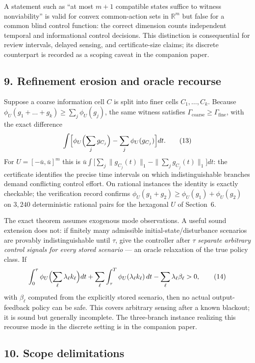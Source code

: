 \documentclass[10pt,twocolumn]{article}
\theoremstyle{definition}
\begin{document}
A statement such as ``at most \(m+1\) compatible states suffice to witness
nonviability'' is valid for convex common-action sets in \(\mathbb{R}^m\) but
false for a common blind control function: the correct dimension counts
independent temporal and informational control decisions. This distinction is
consequential for review intervals, delayed sensing, and certificate-size
claims; its discrete counterpart is recorded as a scoping caveat in the
companion paper.

\subsection{9. Refinement erosion and oracle recourse}\label{erosion}

Suppose a coarse information cell \(C\) is split into finer cells
\(C_1,\dots,C_k\). Because
\(\phi_U(g_1 + \dots + g_k) \ge \sum_j \phi_U(g_j)\), the same witness
satisfies \(\Gamma_{\mathrm{coarse}} \ge \Gamma_{\mathrm{fine}}\), with the
exact difference
\[
\int \Bigl[ \phi_U\Bigl(\sum_j g_{C_j}\Bigr) - \sum_j \phi_U(g_{C_j}) \Bigr]
dt.
\tag{13}
\]
For \(U = [-\bar u, \bar u]^m\) this is \(\bar u \int \bigl[\sum_j
\|g_{C_j}(t)\|_1 - \|\sum_j g_{C_j}(t)\|_1\bigr] dt\): the certificate
identifies the precise time intervals on which indistinguishable branches
demand conflicting control effort. On rational instances the identity is
exactly checkable; the verification record confirms \(\phi_U(g_1 + g_2) \ge
\phi_U(g_1) + \phi_U(g_2)\) on \(3{,}240\) deterministic rational pairs for
the hexagonal \(U\) of Section~6.

The exact theorem assumes exogenous mode observations. A useful sound
extension does not: if finitely many admissible initial-state/disturbance
scenarios are provably indistinguishable until \(\tau\), give the controller
after \(\tau\) \emph{separate arbitrary control signals for every stored
scenario} --- an oracle relaxation of the true policy class. If
\[
\int_0^\tau \phi_U\Bigl(\sum_\ell \lambda_\ell k_\ell\Bigr) dt
+ \sum_\ell \int_\tau^T \phi_U(\lambda_\ell k_\ell)\, dt
- \sum_\ell \lambda_\ell \beta_\ell > 0,
\tag{14}
\]
with \(\beta_\ell\) computed from the explicitly stored scenario, then no
actual output-feedback policy can be safe. This covers arbitrary sensing
after a known blackout; it is sound but generally incomplete. The
three-branch instance realizing this recourse mode in the discrete setting is
in the companion paper.

\subsection{10. Scope delimitations}\label{scope}
\end{document}
